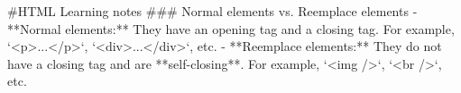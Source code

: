 #HTML Learning notes
### Normal elements vs. Reemplace elements
- **Normal elements:** They have an opening tag and a closing tag. For example, `<p>...</p>`, `<div>...</div>`, etc.
- **Reemplace elements:** They do not have a closing tag and are **self-closing**. For example, `<img />`, `<br />`, etc.